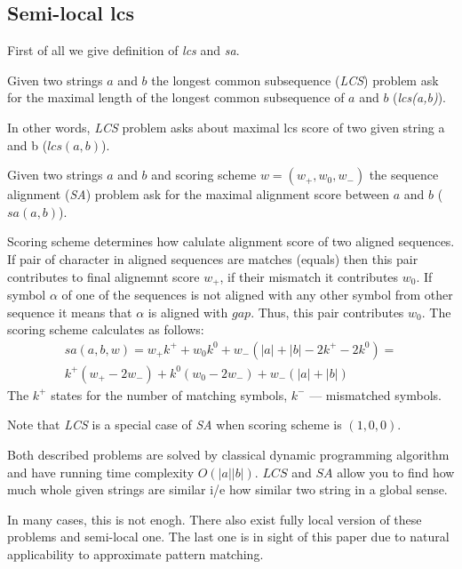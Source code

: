 \subsection{Semi-local lcs}
First of all we give definition of \emph{lcs} and \emph{sa}.

\begin{definition}
Given two strings $a$ and $b$  the longest common subsequence (\emph{LCS}) problem ask for the maximal length of the longest common subsequence of $a$ and $b$ (\emph{lcs(a,b)}).
\end{definition} 
In other words, \emph{LCS} problem asks about maximal lcs score of two given string a and b ($lcs(a,b)$).

\begin{definition}
Given two strings $a$ and $b$ and scoring scheme $w=(w_{+},w_{0},w_{-})$  the sequence alignment (\emph{SA}) problem ask for the maximal alignment score between $a$ and $b$ ($sa(a,b)$).
\end{definition}

Scoring scheme determines how calulate alignment score of two aligned sequences.
If pair of character in aligned sequences are matches (equals) then this pair  contributes to final alignemnt score $w_{+}$, if their mismatch it contributes $w_{0}$.
If symbol $\alpha$ of one of the sequences is not aligned with  any other symbol from other sequence it means that $\alpha$ is aligned with $gap$.
Thus, this pair contributes $w_{0}$.    
The scoring scheme calculates as follows:
\begin{equation}\label{formula:sa}
\begin{aligned}
    sa(a,b,w) = w_{+}k^{+} + w_{0}k^{0} + w_{-} (|a| + |b| - 2k^{+} - 2k^{0}) =\\
    k^{+} (w_{+} - 2w_{-} ) + k^{0}  (w_{0} - 2w_{-}) + w_{-}(|a| + |b|)
\end{aligned}
\end{equation}
The $k^{+}$ states for the number of matching symbols, $k^{-}$ --- mismatched symbols. 

Note that  \emph{LCS} is a special case of \emph{SA} when scoring scheme is $(1,0,0)$.

Both described problems are solved by  classical dynamic programming algorithm and have running time complexity $O(|a||b|)$.
$LCS$ and $SA$ allow you to find how much whole given strings are similar i/e how similar two string in a global sense.

In many cases, this is not enogh.
There also exist fully local version of these problems and semi-local one.
The last one is in sight of this paper due to natural applicability to approximate pattern matching. 
